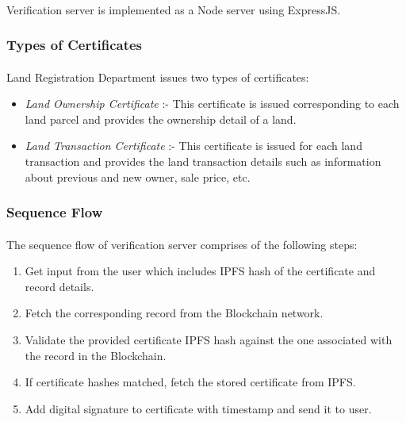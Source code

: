 \documentclass{article}
\begin{document}
        \paragraph{}
        Verification server is implemented as a Node server using ExpressJS.
        
        \subsubsection{Types of Certificates}
        \paragraph{}
        Land Registration Department issues two types of certificates:
        \begin{itemize}
            \item \textit{Land Ownership Certificate} :- This certificate is issued corresponding to each land parcel and provides the ownership detail of a land.
            \item \textit{Land Transaction Certificate} :-  This certificate is issued for each land transaction and provides the land transaction details such as information about previous and new owner, sale price, etc.
        \end{itemize}
        
        \subsubsection{Sequence Flow}
        \paragraph{}
        The sequence flow of verification server comprises of the following steps:
        \begin{enumerate}
            \item Get input from the user which includes IPFS hash of the certificate and record details.
            \item Fetch the corresponding record from the Blockchain network.
            \item Validate the provided certificate IPFS hash against the one associated with the record in the Blockchain.
            \item If certificate hashes matched, fetch the stored certificate from IPFS.
            \item Add digital signature to certificate with timestamp and send it to user.
        \end{enumerate}
        
\end{document}
